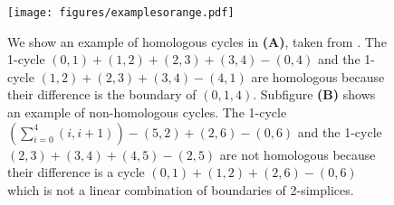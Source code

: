 \begin{figure}[h!]
\begin{center}
\texttt{[image: figures/examplesorange.pdf]}%
\end{center}
\caption{We show an example of homologous cycles in \textbf{(A)}, taken from \cite{TZH15}. The 1-cycle $(0,1) + (1,2) + (2,3) + (3,4) - (0,4)$ and the 1-cycle $(1,2) + (2,3) + (3,4) - (4,1)$ are homologous because their difference is the boundary of $(0,1,4)$. Subfigure \textbf{(B)} shows an example of non-homologous cycles. The 1-cycle $(\sum_{i=0}^4 (i, i+1))-(5,2)+(2,6)-(0,6)$ and the 1-cycle $(2,3) + (3,4)+(4,5)-(2,5)$ are not homologous because their difference is a cycle $(0,1)+(1,2)+(2,6)-(0,6)$ which is not a linear combination of boundaries of 2-simplices. } \label{fig:boundaryexample}
\end{figure}